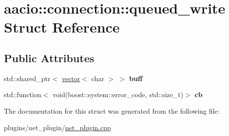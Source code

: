 \hypertarget{structaacio_1_1connection_1_1queued__write}{}\section{aacio\+:\+:connection\+:\+:queued\+\_\+write Struct Reference}
\label{structaacio_1_1connection_1_1queued__write}
\subsection*{Public Attributes}
\begin{DoxyCompactItemize}
\item 
\mbox{\label{structaacio_1_1connection_1_1queued__write_ad4ec295007123c15f43c81ac443e4c3e}} 
std\+::shared\+\_\+ptr$<$ \mbox{\hyperlink{classstd_1_1vector}{vector}}$<$ char $>$ $>$ {\bfseries buff}
\item 
\mbox{\label{structaacio_1_1connection_1_1queued__write_a103088ee12812fe70d97e6122f47e963}} 
std\+::function$<$ void(boost\+::system\+::error\+\_\+code, std\+::size\+\_\+t)$>$ {\bfseries cb}
\end{DoxyCompactItemize}


The documentation for this struct was generated from the following file\+:\begin{DoxyCompactItemize}
\item 
plugins/net\+\_\+plugin/\mbox{\hyperlink{net__plugin_8cpp}{net\+\_\+plugin.\+cpp}}\end{DoxyCompactItemize}
